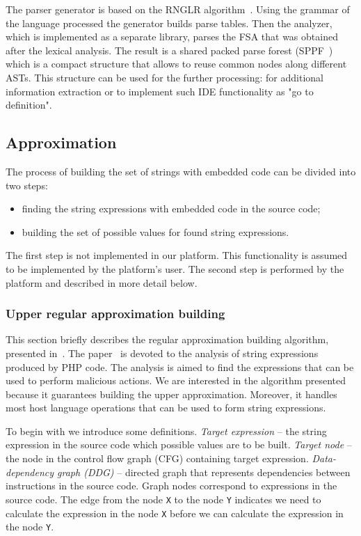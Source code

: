 \documentclass{sig-alternate-05-2015}
\begin{document}
The parser generator is based on the RNGLR algorithm~\cite{RNGLR:ref}. Using the grammar of the language processed the generator builds parse tables. Then the analyzer, which is implemented as a separate library, parses the FSA that was obtained after the lexical analysis. The result is a shared packed parse forest (SPPF~\cite{SPPF:ref}) which is a compact structure that allows to reuse common nodes along different ASTs. This structure can be used for the further processing: for additional information extraction or to implement such IDE functionality as "go to definition".

\subsection{Approximation}

The process of building the set of strings with embedded code can be divided into two steps:
\begin{itemize}
\item finding the string expressions with embedded code in the source code;
\item building the set of possible values for found string expressions.
\end{itemize}

The first step is not implemented in our platform. This functionality is assumed to be implemented by the platform's user. The second step is performed by the platform and described in more detail below.

\subsubsection{Upper regular approximation building}

This section briefly describes the regular approximation building algorithm, presented in~\cite{Upper_Approximation:ref}. The paper~\cite{Upper_Approximation:ref} is devoted to the analysis of string expressions produced by PHP code. The analysis is aimed to find the expressions that can be used to perform malicious actions. We are interested in the algorithm presented because it guarantees building the upper approximation. Moreover, it handles most host language operations that can be used to form string expressions.

To begin with we introduce some definitions. \textit{Target expression} -- the string expression in the source code which possible values are to be built. \textit{Target node} -- the node in the control flow graph (CFG) containing target expression. \textit{Data-dependency graph (DDG)} -- directed graph that represents dependencies between instructions in the source code. Graph nodes correspond to expressions in the source code. The edge from the node \verb|X| to the node \verb|Y| indicates we need to calculate the expression in the node \verb|X| before we can calculate the expression in the node \verb|Y|.
\end{document}
